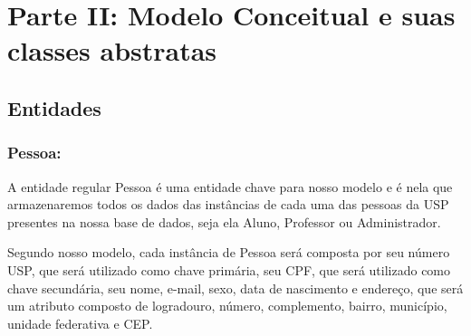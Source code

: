\documentclass{report}
\begin{document}
\chapter{Parte II: Modelo Conceitual e suas classes abstratas}

\section{Entidades}
\subsection{Pessoa:}
  A entidade regular Pessoa é uma entidade chave para nosso modelo e é nela que armazenaremos todos os dados das instâncias de cada uma das pessoas da USP presentes na nossa base de dados, seja ela Aluno, Professor ou Administrador.
  
  Segundo nosso modelo, cada instância de Pessoa será composta por seu número USP, que será utilizado como chave primária, seu CPF, que será utilizado como chave secundária, seu nome, e-mail, sexo, data de nascimento e endereço, que será um atributo composto de logradouro, número, complemento, bairro, município, unidade federativa e CEP.
  
\end{document}
